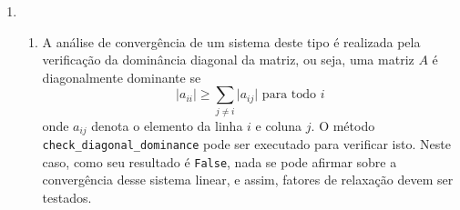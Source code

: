 \documentclass{article}
\newenvironment{arabenum}{
    \begin{enumerate}[label=\textbf{\arabic*})]
}{
    \end{enumerate}
}
\newenvironment{alphenum}{
    \begin{enumerate}[label=(\alph*)]
}{
    \end{enumerate}
}
\begin{document}
\begin{arabenum}
\begin{alphenum}
\begin{itemize}
\item Para subtrações, tem-se
\begin{equation*}
c \cdot n + \sum_{i=1}^n \sum_{j=i+1}^n c
+ \sum_{i=1}^n \sum_{j=i+1}^n \sum_{k=i+1}^n c
= c \cdot n \cdot \Big( \frac{1}{6}(2n^2 - 3n + 1) + \frac{1}{2}(n-1) + 1 \Big)
= \boldsymbol{333400}c
\end{equation*}

\item Para multiplicações, tem-se
\begin{equation*}
2 \cdot \Big( \sum_{i=1}^n \sum_{j=i+1}^n c \Big)
+ \sum_{i=1}^n \sum_{j=i+1}^n \sum_{k=i+1}^n c
= c \cdot n \cdot \Big( (n-1) + \frac{1}{6}(2n^2 - 3n + 1) \Big)
= \boldsymbol{338250}c
\end{equation*}

\item Para divisões, tem-se
\begin{equation*}
c \cdot n + \sum_{i=1}^n \sum_{j=i+1}^n c
= c \cdot n \cdot \Big( \frac{1}{2}(n-1) + 1 \Big) = \boldsymbol{5050}c
\end{equation*}

\end{itemize}

Então, o número final de operações é de
\begin{equation*}
c \cdot n \cdot \Big( \frac{5}{2}(n-1) + \frac{1}{3}(2n^2 - 3n + 1) + 2 \Big)
= \boldsymbol{681650}c.
\end{equation*}

\end{alphenum}

\item \begin{alphenum}

\item A análise de convergência de um sistema deste tipo é realizada pela
verificação da dominância diagonal da matriz, ou seja, uma matriz $A$ é
diagonalmente dominante se
\begin{equation*}
\vert a_{ii} \vert \geq \sum_{j \neq i} \vert a_{ij} \vert \text{ para todo } i
\end{equation*}
onde $a_{ij}$ denota o elemento da linha $i$ e coluna $j$. O método
\texttt{check\_diagonal\_dominance} pode ser executado para verificar isto.
Neste caso, como seu resultado é \verb!False!, nada se pode afirmar sobre a
convergência desse sistema linear, e assim, fatores de relaxação devem ser
testados.


\end{alphenum}
\end{arabenum}
\end{document}
